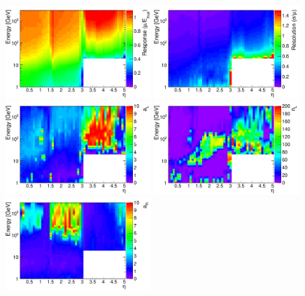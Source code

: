 \begin{figure}[hbtp]
\begin{center}
\includegraphics[width=0.49\textwidth]{figures/mu_tot_interp.pdf}
\includegraphics[width=0.49\textwidth]{figures/sigma_tot_interp.pdf}
\includegraphics[width=0.49\textwidth]{figures/aL_tot_interp.pdf}
\includegraphics[width=0.49\textwidth]{figures/nL_tot_interp.pdf}
\includegraphics[width=0.49\textwidth]{figures/aR_tot_interp.pdf}

\end{center}
\end{figure}
